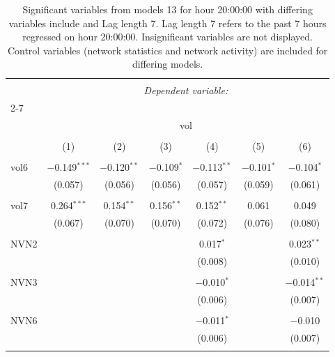 
\begin{table}[!htbp] \centering 
  \caption{Significant variables from models 13 for hour 20:00:00 with differing variables include 
                               and Lag length 7. Lag length 7 refers to the past 7 hours regressed on hour 20:00:00. 
                               Insignificant variables are not displayed. 
                               Control variables (network statistics and network activity) are 
                               included for differing models.} 
  \label{Volumemodels1_t_hourlagged7} 
\scriptsize 
\begin{tabular}{@{\extracolsep{5pt}}lcccccc} 
\\[-1.8ex]\hline 
\hline \\[-1.8ex] 
 & \multicolumn{6}{c}{\textit{Dependent variable:}} \\ 
\cline{2-7} 
\\[-1.8ex] & \multicolumn{6}{c}{vol} \\ 
\\[-1.8ex] & (1) & (2) & (3) & (4) & (5) & (6)\\ 
\hline \\[-1.8ex] 
 vol6 & $-$0.149$^{***}$ & $-$0.120$^{**}$ & $-$0.109$^{*}$ & $-$0.113$^{**}$ & $-$0.101$^{*}$ & $-$0.104$^{*}$ \\ 
  & (0.057) & (0.056) & (0.056) & (0.057) & (0.059) & (0.061) \\ 
  & & & & & & \\ 
 vol7 & 0.264$^{***}$ & 0.154$^{**}$ & 0.156$^{**}$ & 0.152$^{**}$ & 0.061 & 0.049 \\ 
  & (0.067) & (0.070) & (0.070) & (0.072) & (0.076) & (0.080) \\ 
  & & & & & & \\ 
 NVN2 &  &  &  & 0.017$^{*}$ &  & 0.023$^{**}$ \\ 
  &  &  &  & (0.008) &  & (0.010) \\ 
  & & & & & & \\ 
 NVN3 &  &  &  & $-$0.010$^{*}$ &  & $-$0.014$^{**}$ \\ 
  &  &  &  & (0.006) &  & (0.007) \\ 
  & & & & & & \\ 
 NVN6 &  &  &  & $-$0.011$^{*}$ &  & $-$0.010 \\ 
  &  &  &  & (0.006) &  & (0.007) \\ 
  & & & & & & \\ 

\end{tabular}
\end{table}
